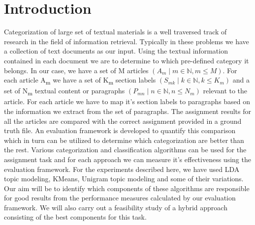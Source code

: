 \section{Introduction}
\label{intro}
Categorization of large set of textual materials is a well traversed track of research in the field of information retrieval. Typically in these problems we have a collection of text documents as our input. Using the textual information contained in each document we are to determine to which pre-defined category it belongs. In our case, we have a set of M articles $(A_m \mid m \in \mathbb{N}, m \leq M)$. For each article A\textsubscript{m} we have a set of K\textsubscript{m} section labels 
$(S_{mk} \mid k \in \mathbb{N}, k \leq K_m)$ and a set of N\textsubscript{m} textual content or paragraphs 
$(P_{mn} \mid n \in \mathbb{N}, n \leq N_m)$ relevant to the article. For each article we have to map it's section labels to paragraphs based on the information we extract from the set of paragraphs. The assignment results for all the articles are compared with the correct assignment provided in a ground truth file.
An evaluation framework is developed to quantify this comparison which in turn can be utilized to determine which categorization are better than the rest.
Various categorization and classification algorithms can be used for the assignment task and for each approach we can measure it's effectiveness using the evaluation framework. For the experiments described here, we have used LDA topic modeling, KMeans, Unigram topic modeling and some of their variations. Our aim will be to identify which components of these algorithms are responsible for good results from the performance measures calculated by our evaluation framework. We will also carry out a feasibility study of a hybrid approach consisting of the best components for this task.

